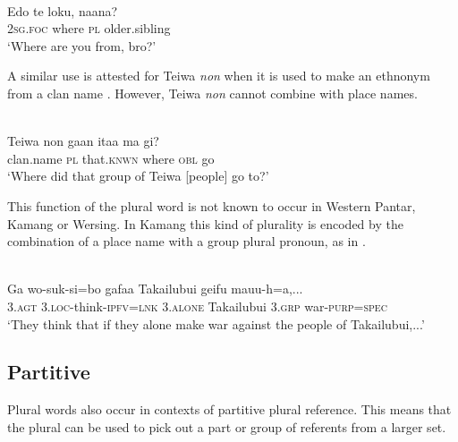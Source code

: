 \ea%
\label{ex:9:81}
 \\
\gll  Edo te loku, {naana?}\\
   \textsc{2sg.foc} where \textsc{pl} older.sibling \\
\glt `Where are you from, bro?'
\z






A similar use is attested for Teiwa \textit{non} when it is used to make an ethnonym from a clan name . However, Teiwa \textit{non} cannot combine with place names.


\ea%
\label{ex:9:82}
 \\
\gll  Teiwa non ga{{\textglotstop}}{an} {ita}{{\textglotstop}}{a} ma gi? \\
   clan.name \textsc{pl} that.\textsc{knwn} where \textsc{obl} go  \\
\glt `Where did that group of Teiwa [people] go to?'
\z






This function of the plural word is not known to occur in Western Pantar, Kamang or Wersing. In Kamang this kind of plurality is encoded by the combination of a place name with a group plural pronoun, as in .


\ea%
\label{ex:9:83}
 \\
\gll  Ga wo-suk-si=bo gafaa Takailubui geifu {mauu-h=a},...\\
   3.\textsc{agt} \textsc{3.loc-}think\textsc{-ipfv=lnk} 3.\textsc{alone} Takailubui 3.\textsc{grp} war-\textsc{purp}=\textsc{spec} \\
\glt `They think that if they alone make war against the people of Takailubui,...'
\z






\subsection{Partitive} %
\label{sec:9:4.4}
Plural words also occur in contexts of partitive plural reference. This means that the plural can be used to pick out a part or group of referents from a larger set.

